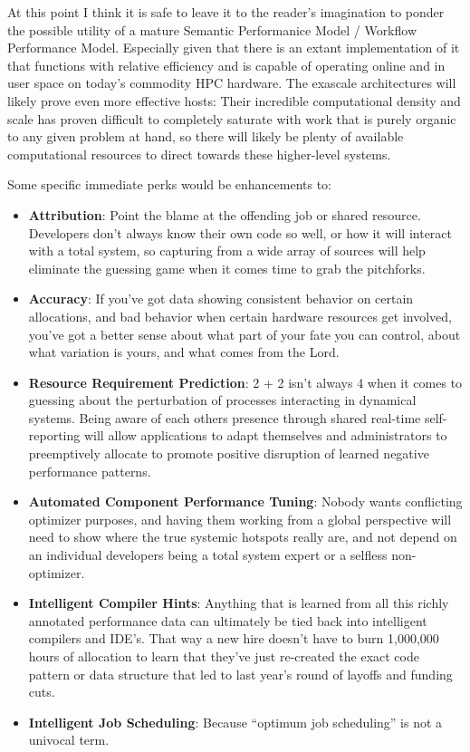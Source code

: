 At this point I think it is safe to leave it to the reader's
imagination to ponder the possible utility of a mature Semantic
Performanice Model / Workflow Performance Model. Especially given that
there is an extant implementation of it that functions with relative
efficiency and is capable of operating online and in user space on
today's commodity HPC hardware. The exascale architectures will likely
prove even more effective hosts: Their incredible computational
density and scale has proven difficult to completely saturate with
work that is purely organic to any given problem at hand, so there
will likely be plenty of available computational resources to direct
towards these higher-level systems.

Some specific immediate perks would be enhancements to:
\begin{itemize}
\item \textbf{Attribution}: Point the blame at the offending job or shared
  resource. Developers don't always know their own code so well,
  or how it will interact with a total system, so capturing from a
  wide array of sources will help eliminate the guessing game when it
  comes time to grab the pitchforks.
\item \textbf{Accuracy}: If you've got data showing consistent behavior on
      certain allocations, and bad behavior when certain hardware resources
      get involved, you've got a better sense about what part of your
      fate you can control, about what variation is yours, and what comes
      from the Lord.
\item \textbf{Resource Requirement Prediction}: 2 + 2 isn't always 4 when it
      comes to guessing about the perturbation of processes interacting in
      dynamical systems. Being aware of each others presence through shared
      real-time self-reporting will allow applications to adapt themselves
      and administrators to preemptively allocate to promote positive
      disruption of learned negative performance patterns.
\item \textbf{Automated Component Performance Tuning}: Nobody wants conflicting
  optimizer purposes, and having them working from a global perspective will
  need to show where the true systemic hotspots really are, and not depend on
  an individual developers being a total system expert or a selfless non-optimizer.
\item \textbf{Intelligent Compiler Hints}: Anything that is learned from all
      this richly annotated performance data can ultimately be tied back
      into intelligent compilers and IDE's. That way a new hire doesn't have
      to burn 1,000,000 hours of allocation to learn that they've just
      re-created the exact code pattern or data structure that led to last
      year's round of layoffs and funding cuts.
\item \textbf{Intelligent Job Scheduling}: Because ``optimum job scheduling''
      is not a univocal term.
\end{itemize}

